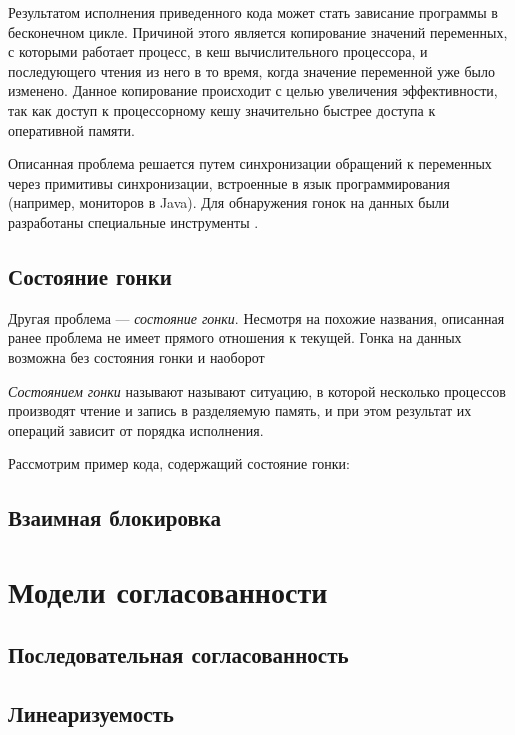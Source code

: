 \documentclass[14pt, openany]{book}
\begin{document}


Результатом исполнения приведенного кода может стать зависание программы в бесконечном цикле. Причиной этого является копирование значений переменных, с которыми работает процесс, в кеш вычислительного процессора, и последующего чтения из него в то время, когда значение переменной уже было изменено. Данное копирование происходит с целью увеличения эффективности, так как доступ к процессорному кешу значительно быстрее \cite{timings} доступа к оперативной памяти. \par
Описанная проблема решается путем синхронизации обращений к переменных через примитивы синхронизации, встроенные в язык программирования (например, мониторов в Java). Для обнаружения гонок на данных были разработаны специальные инструменты \cite{threadSanitizer, javaThreadSanitizer}.

\subsection{Состояние гонки}
Другая проблема --- \textit{состояние гонки}. Несмотря на похожие названия, описанная ранее проблема не имеет прямого отношения к текущей. Гонка на данных возможна без состояния гонки и наоборот \cite{dataRaceVsCondition}  \par
\textit{Состоянием гонки} называют \cite{raceCondition} называют ситуацию, в которой несколько процессов производят чтение и запись в разделяемую память, и при этом результат их операций зависит от порядка исполнения.\par
Рассмотрим пример кода, содержащий состояние гонки:


\subsection{Взаимная блокировка}

\section{Модели согласованности}

\subsection{Последовательная согласованность}

\subsection{Линеаризуемость}
\end{document}
